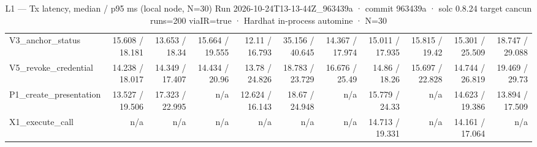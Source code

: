 \begin{table}[ht]
\begin{tabular}{lrrrrrrrrrr}
V3\_anchor\_status & 15.608 / 18.181 & 13.653 / 18.34 & 15.664 / 19.555 & 12.11 / 16.793 & 35.156 / 40.645 & 14.367 / 17.974 & 15.011 / 17.935 & 15.815 / 19.42 & 15.301 / 25.509 & 18.747 / 29.088 \\
V5\_revoke\_credential & 14.238 / 18.017 & 14.349 / 17.407 & 14.434 / 20.96 & 13.78 / 24.826 & 18.783 / 23.729 & 16.676 / 25.49 & 14.86 / 18.26 & 15.697 / 22.828 & 14.744 / 26.819 & 19.469 / 29.73 \\
P1\_create\_presentation & 13.527 / 19.506 & 17.323 / 22.995 & n/a & 12.624 / 16.143 & 18.67 / 24.948 & n/a & 15.779 / 24.33 & n/a & 14.623 / 19.386 & 13.894 / 17.509 \\
X1\_execute\_call & n/a & n/a & n/a & n/a & n/a & n/a & 14.713 / 19.331 & n/a & 14.161 / 17.064 & n/a \\
\bottomrule
\end{tabular}
\caption{L1 — Tx latency, median / p95 ms (local node, N=30) Run 2026-10-24T13-13-44Z\_963439a · commit 963439a · solc 0.8.24 target cancun runs=200 viaIR=true · Hardhat in-process automine · N=30}
\label{tab:crud_latency_tx}
\end{table}
